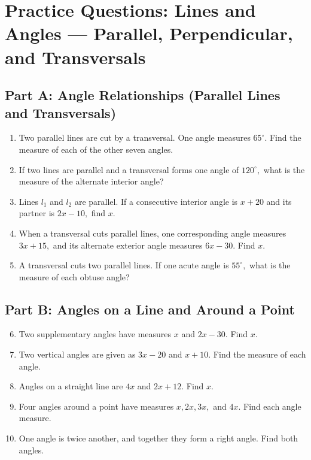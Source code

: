 \documentclass[14pt]{extarticle}
\begin{document}
\newpage


\section*{Practice Questions: Lines and Angles — Parallel, Perpendicular, and Transversals}

\subsection*{Part A: Angle Relationships (Parallel Lines and Transversals)}
\begin{enumerate}
  \item Two parallel lines are cut by a transversal. One angle measures \(65^\circ.\) Find the measure of each of the other seven angles.
  \item If two lines are parallel and a transversal forms one angle of \(120^\circ,\) what is the measure of the alternate interior angle?
  \item Lines \(l_1\) and \(l_2\) are parallel. If a consecutive interior angle is \(x + 20\) and its partner is \(2x - 10,\) find \(x.\)
  \item When a transversal cuts parallel lines, one corresponding angle measures \(3x + 15,\) and its alternate exterior angle measures \(6x - 30.\) Find \(x.\)
  \item A transversal cuts two parallel lines. If one acute angle is \(55^\circ,\) what is the measure of each obtuse angle?
\end{enumerate}

\subsection*{Part B: Angles on a Line and Around a Point}
\begin{enumerate}
  \setcounter{enumi}{5}
  \item Two supplementary angles have measures \(x\) and \(2x - 30.\) Find \(x.\)
  \item Two vertical angles are given as \(3x - 20\) and \(x + 10.\) Find the measure of each angle.
  \item Angles on a straight line are \(4x\) and \(2x + 12.\) Find \(x.\)
  \item Four angles around a point have measures \(x, 2x, 3x,\) and \(4x.\) Find each angle measure.
  \item One angle is twice another, and together they form a right angle. Find both angles.
\end{enumerate}
\end{document}
